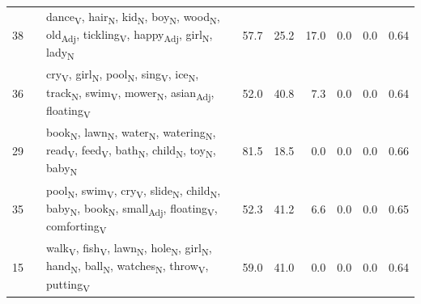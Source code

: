 \begin{landscape}
\begin{xltabular}{\linewidth}{r >{\raggedright\arraybackslash}p{2.9cm} >{\raggedright\arraybackslash}X r r r r r r}
38 &  & dance\textsubscript{V}, hair\textsubscript{N}, kid\textsubscript{N}, boy\textsubscript{N}, wood\textsubscript{N}, old\textsubscript{Adj}, tickling\textsubscript{V}, happy\textsubscript{Adj}, girl\textsubscript{N}, lady\textsubscript{N} & 57.7 & 25.2 & 17.0 & 0.0 & 0.0 & 0.64 \\
36 &  & cry\textsubscript{V}, girl\textsubscript{N}, pool\textsubscript{N}, sing\textsubscript{V}, ice\textsubscript{N}, track\textsubscript{N}, swim\textsubscript{V}, mower\textsubscript{N}, asian\textsubscript{Adj}, floating\textsubscript{V} & 52.0 & 40.8 & 7.3 & 0.0 & 0.0 & 0.64 \\
29 &  & book\textsubscript{N}, lawn\textsubscript{N}, water\textsubscript{N}, watering\textsubscript{N}, read\textsubscript{V}, feed\textsubscript{V}, bath\textsubscript{N}, child\textsubscript{N}, toy\textsubscript{N}, baby\textsubscript{N} & 81.5 & 18.5 & 0.0 & 0.0 & 0.0 & 0.66 \\
35 &  & pool\textsubscript{N}, swim\textsubscript{V}, cry\textsubscript{V}, slide\textsubscript{N}, child\textsubscript{N}, baby\textsubscript{N}, book\textsubscript{N}, small\textsubscript{Adj}, floating\textsubscript{V}, comforting\textsubscript{V} & 52.3 & 41.2 & 6.6 & 0.0 & 0.0 & 0.65 \\
15 &  & walk\textsubscript{V}, fish\textsubscript{V}, lawn\textsubscript{N}, hole\textsubscript{N}, girl\textsubscript{N}, hand\textsubscript{N}, ball\textsubscript{N}, watches\textsubscript{N}, throw\textsubscript{V}, putting\textsubscript{V} & 59.0 & 41.0 & 0.0 & 0.0 & 0.0 & 0.64 \\
\end{xltabular}
\end{landscape}
